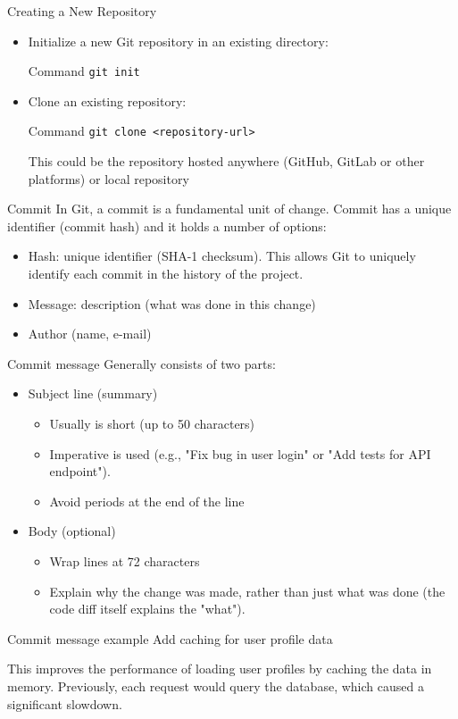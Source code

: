 \documentclass{beamer}
\begin{document}
\begin{frame}{Creating a New Repository}
  \begin{itemize}
    \item Initialize a new Git repository in an existing directory:
    \begin{block}{Command}
        \texttt{git init}
    \end{block}
    \item Clone an existing repository:
    \begin{block}{Command}
        \texttt{git clone <repository-url>}
    \end{block}
      This could be the repository hosted anywhere (GitHub, GitLab or other platforms) or local repository
  \end{itemize}
\end{frame}

\begin{frame}{Commit}
  In Git, a commit is a fundamental unit of change.
  Commit has a unique identifier (commit hash) and it holds a number of options:
  \begin{itemize}
    \item Hash: unique identifier (SHA-1 checksum).
        This allows Git to uniquely identify each commit in the history of the project.
    \item Message: description (what was done in this change)
    \item Author (name, e-mail)
  \end{itemize}
\end{frame}

\begin{frame}{Commit message}
  Generally consists of two parts:
  \begin{itemize}
    \item Subject line (summary)
      \begin{itemize}
        \item Usually is short (up to 50 characters)
        \item Imperative is used (e.g., "Fix bug in user login" or "Add tests for API endpoint").
        \item Avoid periods at the end of the line
      \end{itemize}
    \item Body (optional)
      \begin{itemize}
        \item Wrap lines at 72 characters
        \item Explain why the change was made, rather than just what was done (the code diff itself explains the "what").
      \end{itemize}
  \end{itemize}
  \begin{block}{Commit message example}
    Add caching for user profile data\vspace{1em}

    This improves the performance of loading user profiles by
    caching the data in memory. Previously, each request would
    query the database, which caused a significant slowdown.
  \end{block}
\end{frame}
\end{document}
